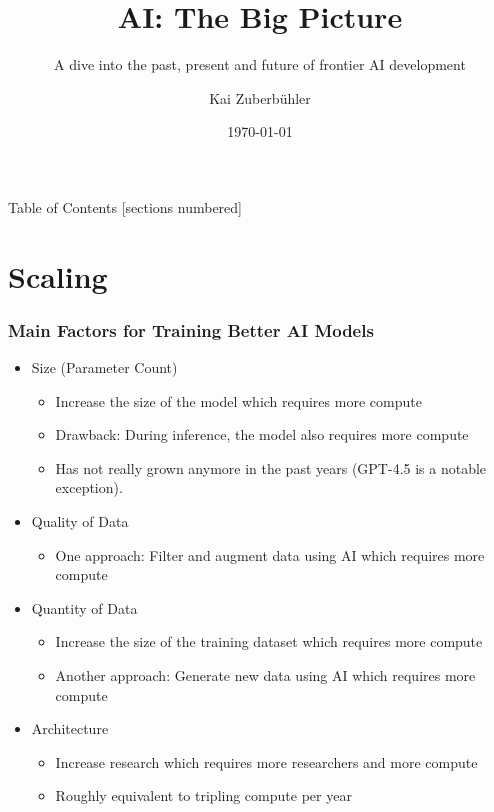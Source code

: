 \documentclass[aspectratio=169]{beamer}
\title{AI: The Big Picture}
\subtitle{A dive into the past, present and future of frontier AI development}
\author{Kai Zuberbühler}
\date{\today}
\begin{document}
    \frame{\titlepage}
    \begin{frame}{Table of Contents}
        [sections numbered]
        \tableofcontents[hideallsubsections]
    \end{frame}


    \section{Scaling}
    \begin{frame}
        \frametitle{Main Factors for Training Better AI Models}
        \begin{itemize}
            \item Size (Parameter Count)
            \begin{itemize}
                \item Increase the size of the model which requires \alert{more compute}
                \item Drawback: During inference, the model also requires \alert{more compute}
                \item Has not really grown anymore in the past years (GPT-4.5 is a notable exception).
            \end{itemize}
            \item Quality of Data
            \begin{itemize}
                \item One approach: Filter and augment data using AI which requires \alert{more compute}
            \end{itemize}
            \item Quantity of Data
            \begin{itemize}
                \item Increase the size of the training dataset which requires \alert{more compute}
                \item Another approach: Generate new data using AI which requires \alert{more compute}
            \end{itemize}
            \item Architecture
            \begin{itemize}
                \item Increase research which requires more researchers and \alert{more compute}
                \item Roughly equivalent to tripling compute per year~\parencite{ho_algorithmic_2024}
            \end{itemize}
        \end{itemize}
    \end{frame}
\end{document}
